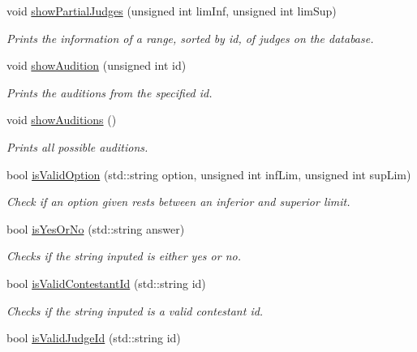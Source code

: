 \begin{DoxyCompactItemize}
void \hyperlink{class_company_m_s_a819d7178b4b677d08b83a35c2c835152}{show\+Partial\+Judges} (unsigned int lim\+Inf, unsigned int lim\+Sup)
\begin{DoxyCompactList}\small\item\em Prints the information of a range, sorted by id, of judges on the database. \end{DoxyCompactList}\item 
void \hyperlink{class_company_m_s_a1eb164cf15206e702bc3fab2e56e75e7}{show\+Audition} (unsigned int id)
\begin{DoxyCompactList}\small\item\em Prints the auditions from the specified id. \end{DoxyCompactList}\item 
\mbox{\label{class_company_m_s_a8f7ea109b9cfd5ca086785da5574001f}} 
void \hyperlink{class_company_m_s_a8f7ea109b9cfd5ca086785da5574001f}{show\+Auditions} ()
\begin{DoxyCompactList}\small\item\em Prints all possible auditions. \end{DoxyCompactList}\item 
bool \hyperlink{class_company_m_s_a396a97beace49c2ba9906cc3c65c337b}{is\+Valid\+Option} (std\+::string option, unsigned int inf\+Lim, unsigned int sup\+Lim)
\begin{DoxyCompactList}\small\item\em Check if an option given rests between an inferior and superior limit. \end{DoxyCompactList}\item 
bool \hyperlink{class_company_m_s_a46d252dd9df2b48044808415d358a407}{is\+Yes\+Or\+No} (std\+::string answer)
\begin{DoxyCompactList}\small\item\em Checks if the string inputed is either yes or no. \end{DoxyCompactList}\item 
bool \hyperlink{class_company_m_s_a2edd6d62bcef40920312bc967591a379}{is\+Valid\+Contestant\+Id} (std\+::string id)
\begin{DoxyCompactList}\small\item\em Checks if the string inputed is a valid contestant id. \end{DoxyCompactList}\item 
bool \hyperlink{class_company_m_s_af4f06b5d99b7cdc6cdca2f98f5a844d5}{is\+Valid\+Judge\+Id} (std\+::string id)

\end{DoxyCompactItemize}
